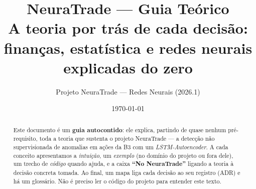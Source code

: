 \documentclass[11pt,a4paper]{article}
\title{\textbf{NeuraTrade --- Guia Teórico}\\[0.3em]
\large A teoria por trás de cada decisão: finanças, estatística e redes
neurais explicadas do zero}
\author{Projeto NeuraTrade --- Redes Neurais (2026.1)}
\date{\today}
\theoremstyle{definition}
\begin{document}
\maketitle

\begin{abstract}
\noindent Este documento é um \textbf{guia autocontido}: ele explica, partindo
de quase nenhum pré-requisito, toda a teoria que sustenta o projeto NeuraTrade
--- a detecção não supervisionada de anomalias em ações da B3 com um
\emph{LSTM-Autoencoder}. A cada conceito apresentamos a \emph{intuição}, um
\emph{exemplo} (no domínio do projeto ou fora dele), um trecho de \emph{código}
quando ajuda, e a caixa \textbf{``No NeuraTrade''} ligando a teoria à decisão
concreta tomada. Ao final, um mapa liga cada decisão ao seu registro (ADR) e há
um glossário. Não é preciso ler o código do projeto para entender este texto.
\end{abstract}

\tableofcontents
\newpage
















\end{document}
